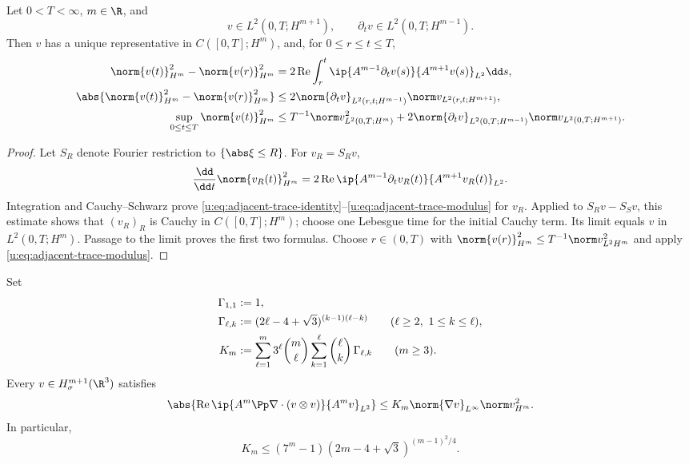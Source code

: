 \begin{lemma}
\label{u:lem:adjacent-trace}
Let \(0<T<\infty\), \(m\in\R\), and
\[
 v\in L^2(0,T;H^{m+1}),
 \qquad
 \partial_tv\in L^2(0,T;H^{m-1}).
\]
Then \(v\) has a unique representative in \(C([0,T];H^m)\), and, for
\(0\le r\le t\le T\),
\begin{align}
 \norm{v(t)}_{H^m}^2-\norm{v(r)}_{H^m}^2
 &=2\operatorname{Re}\int_r^t
 \ip{A^{m-1}\partial_tv(s)}{A^{m+1}v(s)}_{L^2}\dd s,
 \label{u:eq:adjacent-trace-identity}\\
 \abs{\norm{v(t)}_{H^m}^2-\norm{v(r)}_{H^m}^2}
 &\le2\norm{\partial_tv}_{L^2(r,t;H^{m-1})}
 \norm v_{L^2(r,t;H^{m+1})},
 \label{u:eq:adjacent-trace-modulus}\\
 \sup_{0\le t\le T}\norm{v(t)}_{H^m}^2
 &\le T^{-1}\norm v_{L^2(0,T;H^m)}^2
 +2\norm{\partial_tv}_{L^2(0,T;H^{m-1})}
 \norm v_{L^2(0,T;H^{m+1})}.
 \label{u:eq:adjacent-trace-sup}
\end{align}
\end{lemma}

\begin{proof}
Let \(S_R\) denote Fourier restriction to \(\{\abs\xi\le R\}\).  For
\(v_R=S_Rv\),
\[
 \frac{\dd}{\dd t}\norm{v_R(t)}_{H^m}^2
 =2\operatorname{Re}\ip{A^{m-1}\partial_tv_R(t)}
 {A^{m+1}v_R(t)}_{L^2}.
\]
Integration and Cauchy--Schwarz prove
\eqref{u:eq:adjacent-trace-identity}--\eqref{u:eq:adjacent-trace-modulus} for
\(v_R\).  Applied to \(S_Rv-S_Sv\), this estimate shows that
\((v_R)_R\) is Cauchy in \(C([0,T];H^m)\); choose one Lebesgue time for the
initial Cauchy term.  Its limit equals \(v\) in
\(L^2(0,T;H^m)\).  Passage to the limit proves the first two formulas.
Choose \(r\in(0,T)\) with
\(\norm{v(r)}_{H^m}^2\le T^{-1}\norm v_{L^2H^m}^2\) and apply
\eqref{u:eq:adjacent-trace-modulus}.
\end{proof}

\begin{lemma}
\label{u:lem:transport-commutator}
Set
\begin{align}
 \Gamma_{1,1}&:=1,\notag\\
 \Gamma_{\ell,k}
 &:=(2\ell-4+\sqrt3)^{(k-1)(\ell-k)}
 \qquad(\ell\ge2,\ 1\le k\le\ell),
 \label{u:eq:explicit-Gamma-lk}\\
 K_m&:=
 \sum_{\ell=1}^{m}3^\ell\binom m\ell
 \sum_{k=1}^{\ell}\binom\ell k\,\Gamma_{\ell,k}
 \qquad(m\ge3).
 \label{u:eq:explicit-commutator-constant}
\end{align}
Every \(v\in H^{m+1}_\sigma(\R^3)\) satisfies
\begin{equation}
 \abs{\operatorname{Re}
 \ip{A^m\Pp\nabla\cdot(v\otimes v)}{A^mv}_{L^2}}
 \le K_m\norm{\nabla v}_{L^\infty}\norm v_{H^m}^2.
 \label{u:eq:transport-commutator}
\end{equation}
In particular,
\begin{equation}
 K_m\le(7^m-1)(2m-4+\sqrt3)^{(m-1)^2/4}.
 \label{u:eq:explicit-commutator-upper-bound}
\end{equation}
\end{lemma}


